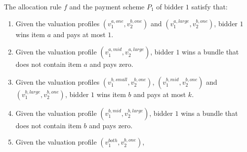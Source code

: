 \begin{lemma}\label{lemma-small-pay-ud}
    The allocation rule $f$ and the payment scheme $P_1$ of bidder $1$ satisfy that:
    \begin{enumerate}
        \item Given the valuation profiles $(v_1^{a,one},v_{2}^{b,one})$ 
        and $(v_1^{a,large},v_{2}^{b,one})$, bidder $1$ wins item $a$ and pays at most $1$.  \label{item-1-ud}
        \item  Given the valuation profile $(v_1^{a,mid},v_2^{a,large})$, bidder $1$ wins a bundle that does not contain item $a$ and pays zero.   \label{item-2-ud}
        \item Given the valuation profiles $(v_1^{b,small},v_2^{b,one})$,
        $(v_1^{b,mid},v_2^{b,one})$ and $(v_1^{b,large},v_2^{b,one})$,  
        bidder $1$ wins item $b$ and pays at most $k$. 
        \label{item-4-ud}
           \item  Given the valuation profile $(v_1^{b,mid},v_2^{b,large})$, bidder $1$ wins a bundle that does not contain item $b$ and pays zero.   \label{item-4.5-ud}
\item Given the valuation profile $(v_1^{both},v_2^{b,one})$, 

\end{enumerate}
\end{lemma}
